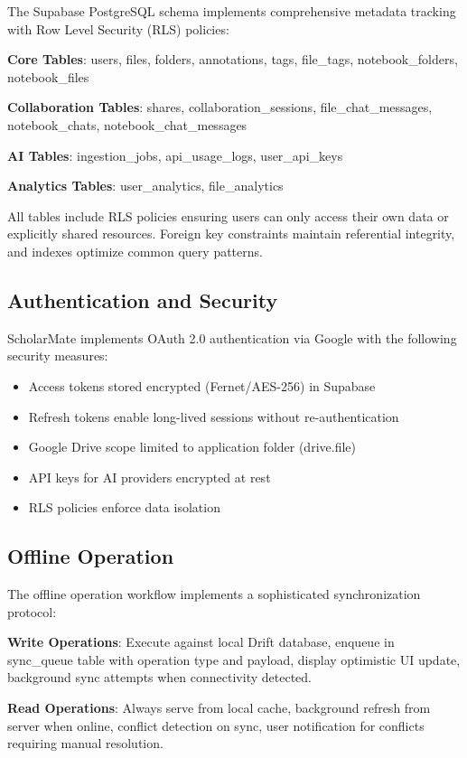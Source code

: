 \documentclass[conference]{IEEEtran}
\begin{document}
The Supabase PostgreSQL schema implements comprehensive metadata tracking with Row Level Security (RLS) policies:

\textbf{Core Tables}: users, files, folders, annotations, tags, file\_tags, notebook\_folders, notebook\_files

\textbf{Collaboration Tables}: shares, collaboration\_sessions, file\_chat\_messages, notebook\_chats, notebook\_chat\_messages

\textbf{AI Tables}: ingestion\_jobs, api\_usage\_logs, user\_api\_keys

\textbf{Analytics Tables}: user\_analytics, file\_analytics

All tables include RLS policies ensuring users can only access their own data or explicitly shared resources. Foreign key constraints maintain referential integrity, and indexes optimize common query patterns.

\subsection{Authentication and Security}

ScholarMate implements OAuth 2.0 authentication via Google with the following security measures:

\begin{itemize}
\item Access tokens stored encrypted (Fernet/AES-256) in Supabase
\item Refresh tokens enable long-lived sessions without re-authentication
\item Google Drive scope limited to application folder (drive.file)
\item API keys for AI providers encrypted at rest
\item RLS policies enforce data isolation
\end{itemize}

\subsection{Offline Operation}

The offline operation workflow implements a sophisticated synchronization protocol:

\textbf{Write Operations}: Execute against local Drift database, enqueue in sync\_queue table with operation type and payload, display optimistic UI update, background sync attempts when connectivity detected.

\textbf{Read Operations}: Always serve from local cache, background refresh from server when online, conflict detection on sync, user notification for conflicts requiring manual resolution.
\end{document}
